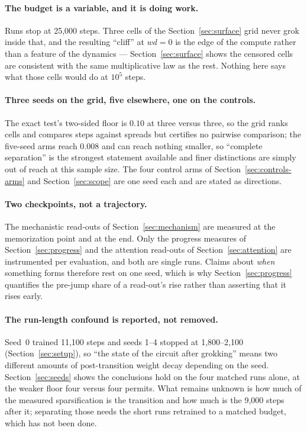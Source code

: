 \documentclass[11pt]{article}
\begin{document}
\paragraph{The budget is a variable, and it is doing work.} Runs stop at
25{,}000 steps. Three cells of the Section~\ref{sec:surface} grid never grok
inside that, and the resulting ``cliff'' at $wd = 0$ is the edge of the
compute rather than a feature of the dynamics --- Section~\ref{sec:surface}
shows the censored cells are consistent with the same multiplicative law as
the rest. Nothing here says what those cells would do at $10^5$ steps.

\paragraph{Three seeds on the grid, five elsewhere, one on the controls.}
The exact test's two-sided floor is $0.10$ at three versus three, so the
grid ranks cells and compares steps against spreads but certifies no pairwise
comparison; the five-seed arms reach $0.008$ and can reach nothing smaller, so
``complete separation'' is the strongest statement available and finer
distinctions are simply out of reach at this sample size. The four control arms
of Section~\ref{sec:controls-arms} and Section~\ref{sec:scope} are one seed
each and are stated as directions.

\paragraph{Two checkpoints, not a trajectory.} The mechanistic read-outs of
Section~\ref{sec:mechanism} are measured at the memorization point and at the
end. Only the progress measures of Section~\ref{sec:progress} and the attention
read-outs of Section~\ref{sec:attention} are instrumented per evaluation, and
both are single runs. Claims about \emph{when} something forms therefore rest
on one seed, which is why Section~\ref{sec:progress} quantifies the pre-jump
share of a read-out's rise rather than asserting that it rises early.

\paragraph{The run-length confound is reported, not removed.} Seed~0 trained
11{,}100 steps and seeds 1--4 stopped at 1{,}800--2{,}100
(Section~\ref{sec:setup}), so ``the state of the circuit after grokking''
means two different amounts of post-transition weight decay depending on the
seed. Section~\ref{sec:seeds} shows the conclusions hold on the four matched
runs alone, at the weaker floor four versus four permits. What remains unknown
is how much of the measured sparsification is the transition and how much is
the 9{,}000 steps after it; separating those needs the short runs retrained to
a matched budget, which has not been done.
\end{document}
